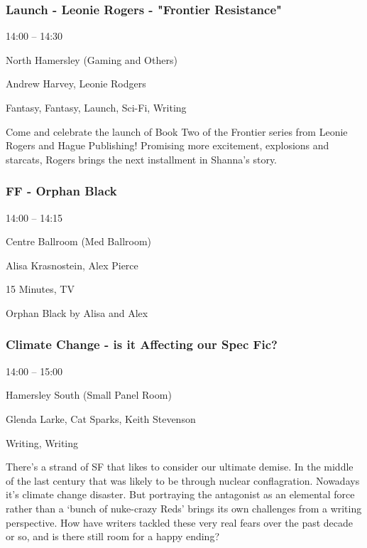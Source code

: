 \documentclass{scrreprt}
\begin{document}
\begin{multicols}{2}
\subsubsection*{Launch - Leonie Rogers - "Frontier Resistance"}\begin{description}
\setlength{\itemsep}{0pt}
\setlength{\parsep}{0pt}
\setlength{\parskip}{0pt}
\item[Time:]{14:00 -- 14:30}
\item[Venue:]{North Hamersley (Gaming and Others)}
\item[People:]{Andrew Harvey, Leonie Rodgers}
\item[Tags:]{Fantasy, Fantasy, Launch, Sci-Fi, Writing}\end{description}
Come and celebrate the launch of Book Two of the Frontier series from Leonie Rogers and Hague Publishing! Promising more excitement, explosions and starcats, Rogers brings the next installment in Shanna's story.
\subsubsection*{FF - Orphan Black}\begin{description}
\setlength{\itemsep}{0pt}
\setlength{\parsep}{0pt}
\setlength{\parskip}{0pt}
\item[Time:]{14:00 -- 14:15}
\item[Venue:]{Centre Ballroom (Med Ballroom)}
\item[People:]{Alisa Krasnostein, Alex Pierce}
\item[Tags:]{15 Minutes, TV}\end{description}
Orphan Black by Alisa and Alex
\subsubsection*{Climate Change - is it Affecting our Spec Fic?}\begin{description}
\setlength{\itemsep}{0pt}
\setlength{\parsep}{0pt}
\setlength{\parskip}{0pt}
\item[Time:]{14:00 -- 15:00}
\item[Venue:]{Hamersley South (Small Panel Room)}
\item[People:]{Glenda Larke, Cat Sparks, Keith Stevenson}
\item[Tags:]{Writing, Writing}\end{description}
There’s a strand of SF that likes to consider our ultimate demise. In the middle of the last century that was likely to be through nuclear conflagration. Nowadays it’s climate change disaster. But portraying the antagonist as an elemental force rather than a ‘bunch of nuke-crazy Reds’ brings its own challenges from a writing perspective. How have writers tackled these very real fears over the past decade or so, and is there still room for a happy ending?

\end{multicols}
\end{document}
